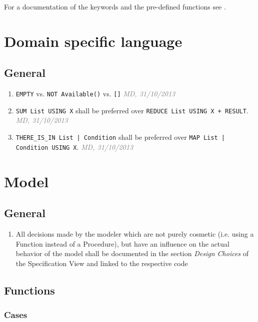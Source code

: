 \documentclass[draft, a4paper, oneside]{scrreprt}
\let\emph\textsl
\newcommand{\literally}[1]{\textsf{\emph{#1}}}
\newcommand{\code}[1]{\lstinline$#1$}
\newcommand{\ruleauthor}[2]{\mbox{}\newline\mbox{}\hfill{\footnotesize\textcolor{gray}{\emph{#1, #2}}}\xspace}}
\newcommand{\ruleauthor}[2]{}
\begin{document}
For a documentation of the keywords and the pre-defined functions see \cite{efstechdesign}.



\chapter{Domain specific language}

\section{General}
\begin{enumerate}
\item {} \code{EMPTY} vs. \code{NOT Available()} vs. \code{[]} \ruleauthor{MD}{31/10/2013}
\item \code{SUM List USING X} shall be preferred over \code{REDUCE List USING X + RESULT}. \ruleauthor{MD}{31/10/2013}
\item \code{THERE_IS_IN List | Condition} shall be preferred over \code{MAP List | Condition USING X}. \ruleauthor{MD}{31/10/2013}
\end{enumerate}


\chapter{Model}

\section{General}

\begin{enumerate}
\item \label{rule:model_general_design_choices} All decisions made by the modeler which are not purely cosmetic (i.e. using a Function instead of a Procedure), but have an influence on the actual behavior of the model shall be documented in the section \literally{Design Choices} of the Specification View and linked to the respective code%

\end{enumerate}


\section{Functions}
\subsection{Cases}
\end{document}
